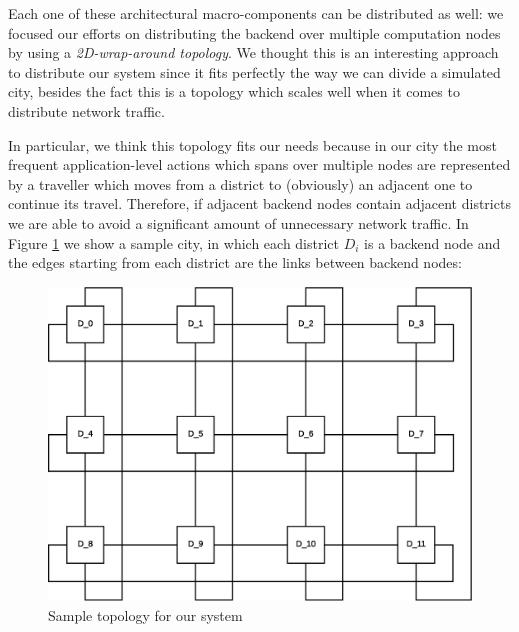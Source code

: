 Each one of these architectural macro-components can be distributed as well: we
focused our efforts on distributing the backend over multiple computation nodes
by using a \textit{2D-wrap-around topology}.
We thought this is an interesting approach to distribute our system since it
fits perfectly the way we can divide a simulated city, besides the fact this is
a topology which scales well when it comes to distribute network traffic.

In particular, we think this topology fits our needs because in our city the
most frequent application-level actions which spans over multiple nodes are
represented by a traveller which moves from a district to (obviously) an
adjacent one to continue its travel.
Therefore, if adjacent backend nodes contain adjacent districts we are able to
avoid a significant amount of unnecessary network traffic. In Figure
\ref{fig:sd-sys-arch-topology} we show a sample city, in which each district
$D_i$ is a backend node and the edges starting from each district are the links
between backend nodes:

\begin{figure}[H]
  \centering
  \includegraphics[scale=0.5,keepaspectratio]
    {images/solution/topology.eps}
  \caption{Sample topology for our system}
  \label{fig:sd-sys-arch-topology}
\end{figure}
